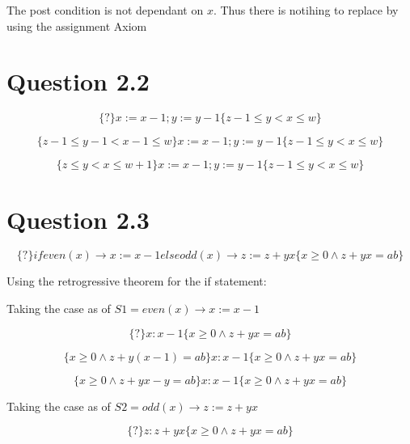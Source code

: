\documentclass[10pt,a4paper]{article}
\begin{document}
The post condition is not dependant on $x$. Thus there is notihing to replace by using the assignment Axiom

\section{Question 2.2}

\begin{equation}
 \{?\} x:=x-1;y:=y-1\{z-1\leq y < x \leq w\}
\end{equation}

\begin{equation}
 \{z-1\leq y-1<x-1\leq w\} x:=x-1;y:=y-1\{z-1\leq y < x \leq w\}
\end{equation}

\begin{equation}
 \{z\leq y<x\leq w+1\} x:=x-1;y:=y-1\{z-1\leq y < x \leq w\}
\end{equation}

\section{Question 2.3}
\begin{equation}
 \{?\} if  even(x) \rightarrow x:=x-1 else  odd(x) \rightarrow z:= z+yx\{x\geq 0 \wedge z + yx = ab \}
\end{equation}




Using the retrogressive theorem for the if statement:

Taking the case as of $S1 = even(x)\rightarrow x:=x-1$

\begin{equation}
 \{?\}x:x-1\{x\geq 0 \wedge z + yx = ab \}
\end{equation}


\begin{equation}
\{x\geq 0 \wedge z + y(x-1) = ab \}x:x-1\{x\geq 0 \wedge z + yx = ab \}
\end{equation}


\begin{equation}
\{x\geq 0 \wedge z + yx-y = ab \}x:x-1\{x\geq 0 \wedge z + yx = ab \}
\end{equation}

Taking the case as of $S2 = odd(x)\rightarrow z:=z+yx$

\begin{equation}
 \{?\}z:z+yx\{x\geq 0 \wedge z + yx = ab \}
\end{equation}
\end{document}

